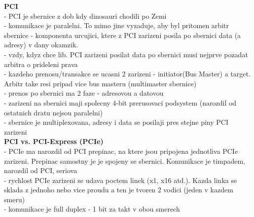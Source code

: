 \documentclass[10pt]{article}
\begin{document}
\textbf{PCI}\\
- PCI je sbernice z dob kdy dinosauri chodili po Zemi\\
- komunikace je paralelni. To mimo jine vyzaduje, aby byl pritomen arbitr sbernice - komponenta urcujici, ktere z PCI zarizeni posila po sbernici data (a adresy) v dany okamzik.\\
- vzdy, kdyz chce lib. PCI zarizeni posilat data po sbernici musi nejprve pozadat arbitra o prideleni prava\\
- kazdeho prenosu/transakce se ucasni 2 zarizeni - initiator(Bus Master) a target. Arbitr take resi pripad vice bus masteru (multimaster sbernice)\\
- prenos po sbernici ma 2 faze - adresovou a datovou\\
- zarizeni na sbernici maji spolecny 4-bit prerusovaci podsystem (narozdil od ostatnich dratu nejsou paralelni)\\
- sbernice je multiplexovana, adresy i data se posilaji pres stejne piny PCI zarizeni\\

\textbf{PCI vs. PCI-Express (PCIe)}\\
- PCIe ma narozdil od PCI prepinac, na ktere jsou pripojena jednotliva PCIe zarizeni. Prepinac samostny je je spojeny se sbernici. Komunikace je timpadem, narozdil od PCI, seriova\\
- rychlost PCIe zarizeni se udava poctem linek (x1, x16 atd.). Kazda linka se sklada z jednoho nebo vice proudu a ten je tvoren 2 vodici (jeden v kazdem smeru)\\
- komunikace je full duplex - 1 bit za takt v obou smerech
\end{document}
